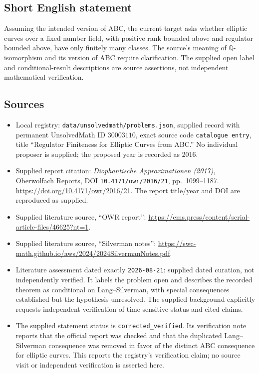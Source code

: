 \documentclass[11pt]{article}
\newcommand{\Q}{\mathbb{Q}}
\begin{document}
\subsection{Short English statement}
Assuming the intended version of ABC, the current target asks whether elliptic curves over a fixed number field, with positive rank bounded above and regulator bounded above, have only finitely many classes. The source's meaning of \(\Q\)-isomorphism and its version of ABC require clarification. The supplied open label and conditional-result descriptions are source assertions, not independent mathematical verification.
\subsection{Sources}
\begin{itemize}
\item Local registry: \texttt{data/unsolvedmath/problems.json}, supplied record with permanent UnsolvedMath ID \(30003110\), exact source code \texttt{catalogue entry}, title ``Regulator Finiteness for Elliptic Curves from ABC.'' No individual proposer is supplied; the proposed year is recorded as 2016.
\item Supplied report citation: \emph{Diophantische Approximationen (2017)}, Oberwolfach Reports, DOI \texttt{10.4171/owr/2016/21}, pp.\ 1099--1187. \url{https://doi.org/10.4171/owr/2016/21}. The report title/year and DOI are reproduced as supplied.
\item Supplied literature source, ``OWR report'': \url{https://ems.press/content/serial-article-files/46625?nt=1}.
\item Supplied literature source, ``Silverman notes'': \url{https://swc-math.github.io/aws/2024/2024SilvermanNotes.pdf}.
\item Literature assessment dated exactly \texttt{2026-08-21}: supplied dated curation, not independently verified. It labels the problem open and describes the recorded theorem as conditional on Lang--Silverman, with special consequences established but the hypothesis unresolved. The supplied background explicitly requests independent verification of time-sensitive status and cited claims.
\item The supplied statement status is \texttt{corrected\_verified}. Its verification note reports that the official report was checked and that the duplicated Lang--Silverman consequence was removed in favor of the distinct ABC consequence for elliptic curves. This reports the registry's verification claim; no source visit or independent verification is asserted here.
\end{itemize}
\end{document}
